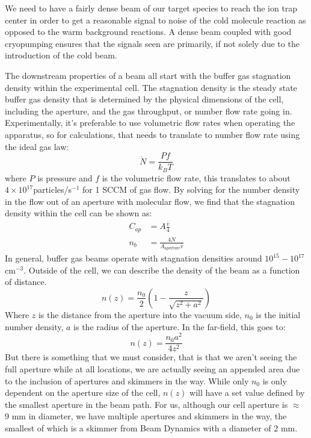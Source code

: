 We need to have a fairly dense beam of our target species to reach the ion trap center in order to get a reasonable signal to noise of the cold molecule reaction as opposed to the warm background reactions. A dense beam coupled with good cryopumping ensures that the signals seen are primarily, if not solely due to the introduction of the cold beam.

The downstream properties of a beam all start with the buffer gas stagnation density within the experimental cell. The stagnation density is the steady state buffer gas density that is determined by the physical dimensions of the cell, including the aperture, and the gas throughput, or number flow rate going in. Experimentally, it's preferable to use volumetric flow rates when operating the apparatus, so for calculations, that needs to translate to number flow rate using the ideal gas law:
\begin{equation*}
	\dot{N} = \frac{P f}{k_B T}
\end{equation*}
where $P$ is pressure and $f$ is the volumetric flow rate, this translates to about $4\times10^{17}$particles/s$^{-1}$ for 1 SCCM of gas flow. By solving for the number density in the flow out of an aperture with molecular flow, we find that the stagnation density within the cell can be shown as:
\begin{align}
	C_{ap} & = A \frac{\bar{v}}{4} \nonumber \\
	n_{b} & = \frac{4 \dot{N}}{A_{\mathrm{aperture}} \bar{v}} \label{eq: n_b}
\end{align}
In general, buffer gas beams operate with stagnation densities around $10^{15}-10^{17}$cm$^{-3}$. Outside of the cell, we can describe the density of the beam as a function of distance. \cite{Pauly}
\begin{equation}
	n(z)=\frac{n_0}{2}\left(1-\frac{z}{\sqrt{z^2+a^2}}\right)
	\label{eq: n(z)}
\end{equation}
Where $z$ is the distance from the aperture into the vacuum side, $n_0$ is the initial number density, $a$ is the radius of the aperture. In the far-field, this goes to:
\begin{equation*}
	n(z)=\frac{n_0 a^2}{4 z^2}
\end{equation*}
But there is something that we must consider, that is that we aren't seeing the full aperture while at all locations, we are actually seeing an appended area due to the inclusion of apertures and skimmers in the way. While only $n_0$ is only dependent on the aperture size of the cell, $n(z)$ will have a set value defined by the smallest aperture in the beam path. For us, although our cell aperture is $\approx$ 9 mm in diameter, we have multiple apertures and skimmers in the way, the smallest of which is a skimmer from Beam Dynamics with a diameter of 2 mm.

